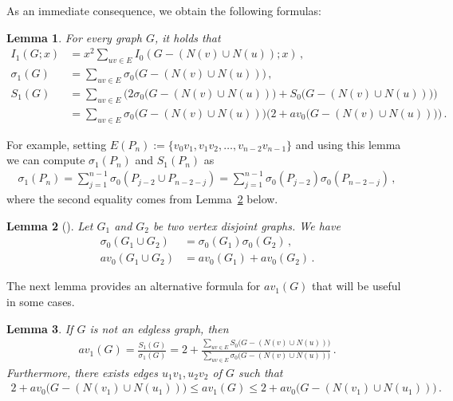 \documentclass[a4paper,12pt]{amsart}
\newtheorem{lemma}{Lemma}
\theoremstyle{remark}
\begin{document}
As an immediate consequence, we obtain the following formulas:
\begin{lemma}\label{av1Exp}
For every graph $G$, it holds that
\begin{align*}
I_1(G;x)&=x^2 \sum_{uv \in E} I_0(G-(N(v) \cup N(u)); x)\,,\\
\sigma_1(G)&=\sum_{uv \in E} \sigma_0\big(G-(N(v) \cup N(u))\big)\,,\\
S_1(G)&=\sum_{uv \in E} \Big(2\sigma_0\big(G-(N(v) \cup N(u))\big) +S_0\big(G-(N(v) \cup N(u))\big) \Big)\\
&=\sum_{uv \in E} \sigma_0\big(G-(N(v) \cup N(u))\big)\Big(2 +av_0\big(G-(N(v) \cup N(u))\big) \Big)\,.
\end{align*}
\end{lemma}

\medskip
For example, setting $E(P_n):=\{v_0v_1, v_1v_2, \ldots, v_{n-2}v_{n-1}\}$ and using this lemma we can compute $\sigma_1(P_n)$ and $S_1(P_n)$ as
\begin{align*}
\sigma_1(P_n)=\sum_{j=1}^{n-1} \sigma_0(P_{j-2} \cup P_{n-2-j} )=\sum_{j=1}^{n-1} \sigma_0(P_{j-2} ) \sigma_0( P_{n-2-j})\,,
\end{align*}
where the second equality comes from Lemma~\ref{0G1UnionG2} below.

\begin{lemma}[\cite{andriantiana2018}]\label{0G1UnionG2}
Let $G_1$ and $G_2$ be two vertex disjoint graphs. We have
\begin{align*}
\sigma_0(G_1 \cup G_2)&= \sigma_0(G_1) \sigma_0(G_2)\,,\\
av_0(G_1 \cup G_2)&= av_0(G_1)+ av_0(G_2)\,.
\end{align*}
\end{lemma}

\medskip

The next lemma provides an alternative formula for $av_1(G)$ that will be useful in some cases.

\begin{lemma}\label{av_1Instance}
If $G$ is not an edgless graph, then
\begin{align*}
av_1(G)=\frac{S_1(G)}{\sigma_1(G)}=2+ \frac{\displaystyle\sum_{uv \in E} S_0\big(G-(N(v) \cup N(u))\big)}{\displaystyle\sum_{uv \in E} \sigma_0\big(G-(N(v) \cup N(u))\big)}\,.
\end{align*}
Furthermore, there exists edges $u_1v_1, u_2v_2$ of $G$ such that
\begin{align*}
2+  av_0\big(G-(N(v_1) \cup N(u_1))\big)  \leq av_1(G) \leq 2+ av_0\big(G-(N(v_1) \cup N(u_1))\big)\,.
\end{align*}
\end{lemma}
\end{document}
